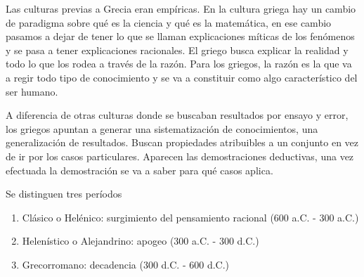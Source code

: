 Las culturas previas a Grecia eran empíricas. En la cultura griega hay un cambio de paradigma sobre qué es la ciencia y qué es la matemática, en ese cambio pasamos a dejar de tener lo que se llaman explicaciones míticas de los fenómenos y se pasa a tener explicaciones racionales. El griego busca explicar la realidad y todo lo que los rodea a través de la razón. Para los griegos, la razón es la que va a regir todo tipo de conocimiento y se va a constituir como algo característico del ser humano. 

A diferencia de otras culturas donde se buscaban resultados por ensayo y error, los griegos apuntan a generar una sistematización de conocimientos, una generalización de resultados. Buscan propiedades atribuibles a un conjunto en vez de ir por los casos particulares. Aparecen las demostraciones deductivas, una vez efectuada la demostración se va a saber para qué casos aplica.

Se distinguen tres períodos

\begin{enumerate}[topsep=0pt,itemsep=-1ex,partopsep=1ex,parsep=1ex]
    \item Clásico o Helénico: surgimiento del pensamiento racional (600 a.C. - 300 a.C.)
    \item Helenístico o Alejandrino: apogeo (300 a.C. - 300 d.C.)
    \item Grecorromano: decadencia (300 d.C. - 600 d.C.)
\end{enumerate}